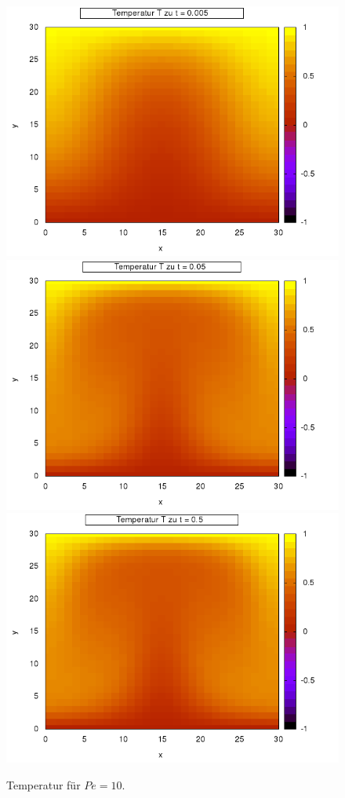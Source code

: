 \documentclass[12pt,a4paper,titlepage,headinclude,bibtotoc]{scrartcl}
\begin{document}
\hfill%
\noindent\begin{minipage}[t]{0.50\textwidth}%
\begin{figure}[H]  
   \includegraphics[width=\linewidth]{res/task4/10_0005.png}
   \includegraphics[width=\linewidth]{res/task4/10_005.png}
   \includegraphics[width=\linewidth]{res/task4/10_05.png}
   \caption{Temperatur für $Pe = 10$.}
   \label{fig:task4_10}
   \end{figure}
\end{minipage}%
\hfill%
\end{document}
